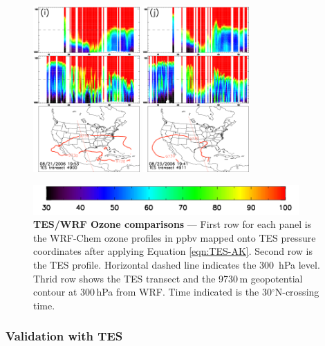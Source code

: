 \begin{figure}
\begin{center}
		\includegraphics[width=1.6in]{o3/o3_4900_ftuv}
		\includegraphics[width=1.6in]{o3/o3_4911_ftuv}
		
		\includegraphics[width=4in]{o3/o3_colorbar}
		\end{center}
	    	\caption[TES/WRF-Chem Ozone comparisons]{\textbf{TES/WRF Ozone comparisons} --- First row for each panel is the WRF-Chem
		ozone profiles in ppbv mapped onto TES pressure coordinates after applying Equation \ref{eqn:TES-AK}. Second row is the
		TES profile. Horizontal dashed line indicates the 300~hPa level. Thrid row shows the TES transect and the  9730\,\unit{m}
		geopotential contour at 300\,\unit{hPa} from WRF. Time indicated is the 30$^\circ$N-crossing time.} \label{fig:2006/o3tes}
	\end{figure}

\subsubsection{Validation with TES}

